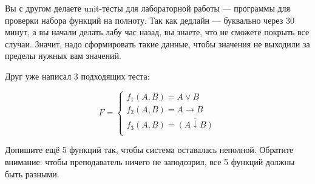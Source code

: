 \question
Вы с другом делаете unit-тесты для лабораторной работы — программы для проверки набора функций на полноту. Так как дедлайн — буквально через 30 минут, а вы начали делать лабу час назад, вы знаете, что не сможете покрыть все случаи. Значит, надо сформировать такие данные, чтобы значения не выходили за пределы нужных вам значений.

Друг уже написал 3 подходящих теста:

\begin{equation*}
    F=
    \begin{cases}
        f_1(A,B)=A \lor B\\
        f_2(A,B)=A \rightarrow B\\
        f_3(A,B)=\overline{(A \downarrow B)}\\
    \end{cases}
\end{equation*}
    
Допишите ещё 5 функций так, чтобы система оставалась неполной. Обратите внимание: чтобы преподаватель ничего не заподозрил, все 5 функций должны быть разными.